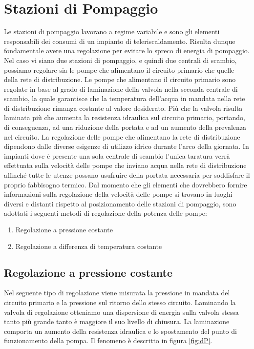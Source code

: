 \documentclass[laurea,oneside,11pt]{USiena_tesiLM}
\begin{document}
\section{Stazioni di Pompaggio}
Le stazioni di pompaggio lavorano a regime variabile e sono gli elementi responsabili dei consumi di un impianto di teleriscaldamento. Risulta dunque fondamentale avere una regolazione per evitare lo spreco di energia di pompaggio. 
Nel caso vi siano due stazioni di pompaggio, e quindi due centrali di scambio, possiamo regolare  sia le pompe che alimentano il circuito primario che quelle della rete di distribuzione. Le pompe che alimentano il circuito primario sono regolate in base al grado di laminazione della valvola nella seconda centrale di scambio, la quale garantisce che la temperatura dell'acqua in mandata nella rete di distribuzione rimanga costante al valore desiderato.  Più che la valvola risulta laminata più che aumenta la resistenza idraulica sul circuito primario, portando, di conseguenza, ad una riduzione della portata e ad un aumento della prevalenza nel circuito. La regolazione delle pompe che alimentano la rete di distribuzione dipendono dalle diverse esigenze di utilizzo idrico durante l'arco della giornata. 
In impianti dove è presente una sola centrale di scambio l'unica taratura verrà effettuata sulla velocità delle pompe che inviano acqua nella rete di distribuzione affinché tutte le utenze possano usufruire della portata necessaria per soddisfare il proprio fabbisogno termico.
Dal momento che gli elementi che dovrebbero fornire informazioni sulla regolazione della velocità delle pompe si  trovano in luoghi diversi e distanti rispetto al posizionamento delle stazioni di pompaggio, sono adottati i seguenti metodi di regolazione della potenza delle pompe:
\begin{enumerate}
\item Regolazione a pressione costante
\item Regolazione a differenza di temperatura costante
\end{enumerate}

\subsection{Regolazione a pressione costante}
Nel seguente tipo di regolazione viene misurata la pressione in mandata del circuito primario e la pressione sul ritorno dello stesso circuito.  Laminando la valvola di regolazione otteniamo una dispersione di energia sulla valvola stessa tanto più grande tanto è maggiore il suo livello di chiusura. La laminazione comporta un aumento della resistenza idraulica e lo spostamento del punto di funzionamento della pompa. Il fenomeno è descritto in figura \ref{fig:dP}.
\end{document}
